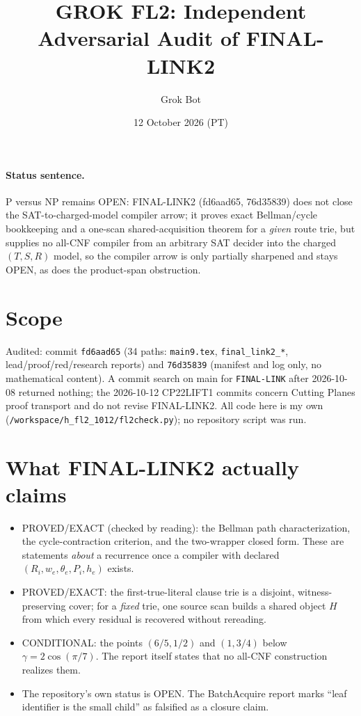 \documentclass[11pt]{article}
\title{GROK FL2: Independent Adversarial Audit of FINAL-LINK2}
\author{Grok Bot}
\date{12 October 2026 (PT)}
\begin{document}
\maketitle
\paragraph{Status sentence.}
P versus NP remains OPEN: FINAL-LINK2 (fd6aad65, 76d35839) does not close the SAT-to-charged-model compiler arrow; it proves exact Bellman/cycle bookkeeping and a one-scan shared-acquisition theorem for a \emph{given} route trie, but supplies no all-CNF compiler from an arbitrary SAT decider into the charged $(T,S,R)$ model, so the compiler arrow is only partially sharpened and stays OPEN, as does the product-span obstruction.

\section{Scope}
Audited: commit \texttt{fd6aad65} (34 paths: \texttt{main9.tex}, \texttt{final\_link2\_*}, lead/proof/red/research reports) and \texttt{76d35839} (manifest and log only, no mathematical content). A commit search on main for \texttt{FINAL-LINK} after 2026-10-08 returned nothing; the 2026-10-12 CP22LIFT1 commits concern Cutting Planes proof transport and do not revise FINAL-LINK2. All code here is my own (\texttt{/workspace/h\_fl2\_1012/fl2check.py}); no repository script was run.

\section{What FINAL-LINK2 actually claims}
\begin{itemize}
\item PROVED/EXACT (checked by reading): the Bellman path characterization, the cycle-contraction criterion, and the two-wrapper closed form. These are statements \emph{about} a recurrence once a compiler with declared $(R_i,w_e,\theta_e,P_i,h_e)$ exists.
\item PROVED/EXACT: the first-true-literal clause trie is a disjoint, witness-preserving cover; for a \emph{fixed} trie, one source scan builds a shared object $H$ from which every residual is recovered without rereading.
\item CONDITIONAL: the points $(6/5,1/2)$ and $(1,3/4)$ below $\gamma=2\cos(\pi/7)$. The report itself states that no all-CNF construction realizes them.
\item The repository's own status is OPEN. The BatchAcquire report marks ``leaf identifier is the small child'' as falsified as a closure claim.
\end{itemize}
\end{document}
